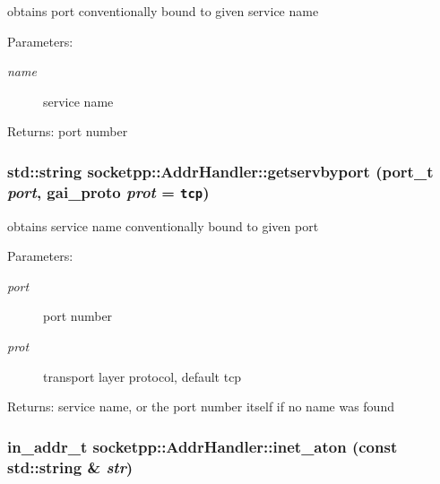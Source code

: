 obtains port conventionally bound to given service name 

\begin{Desc}
\item[Parameters:]
\begin{description}
\item[{\em name}]service name \end{description}
\end{Desc}
\begin{Desc}
\item[Returns:]port number \end{Desc}
\hypertarget{classsocketpp_1_1AddrHandler_c099c4bdf0b45e5d4a1e5806d896768e}{
\subsubsection[{getservbyport}]{\setlength{\rightskip}{0pt plus 5cm}std::string socketpp::AddrHandler::getservbyport (port\_\-t {\em port}, \/  gai\_\-proto {\em prot} = {\tt tcp})}}
\label{classsocketpp_1_1AddrHandler_c099c4bdf0b45e5d4a1e5806d896768e}


obtains service name conventionally bound to given port 

\begin{Desc}
\item[Parameters:]
\begin{description}
\item[{\em port}]port number \item[{\em prot}]transport layer protocol, default tcp \end{description}
\end{Desc}
\begin{Desc}
\item[Returns:]service name, or the port number itself if no name was found \end{Desc}
\hypertarget{classsocketpp_1_1AddrHandler_e2eda37cd4c20059c557e4e65c829cf8}{
\subsubsection[{inet\_\-aton}]{\setlength{\rightskip}{0pt plus 5cm}in\_\-addr\_\-t socketpp::AddrHandler::inet\_\-aton (const std::string \& {\em str})}}
\label{classsocketpp_1_1AddrHandler_e2eda37cd4c20059c557e4e65c829cf8}


